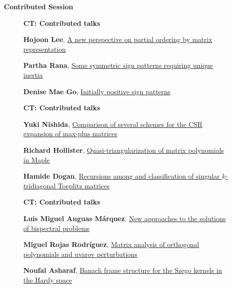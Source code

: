 \documentclass[ILAS2025-program.tex]{subfiles}
\begin{document}
    \begin{description}
    \item[] \textbf{Contributed Session} 
    \begin{description}
    \item[] {\color{mstitle}\textbf{CT: Contributed talks}} 
    \item[] \hypertarget{up0395}{}\textbf{Hojoon Lee}, \hyperlink{down0395}{A new perspective on partial ordering by matrix representation}
        \item[] \hypertarget{up0396}{}\textbf{Partha Rana}, \hyperlink{down0396}{Some symmetric sign patterns requiring unique inertia}
        \item[] \hypertarget{up0397}{}\textbf{Denise Mae Go}, \hyperlink{down0397}{Initially positive sign patterns}
        \end{description}
    \begin{description}
    \item[] {\color{mstitle}\textbf{CT: Contributed talks}} 
    \item[] \hypertarget{up0398}{}\textbf{Yuki Nishida}, \hyperlink{down0398}{Comparison of several schemes for the CSR expansion of max-plus matrices}
        \item[] \hypertarget{up0399}{}\textbf{Richard Hollister}, \hyperlink{down0399}{Quasi-triangularization of matrix polynomials in Maple}
        \item[] \hypertarget{up0400}{}\textbf{Hamide Dogan}, \hyperlink{down0400}{Recursions among and classification of singular $k$-tridiagonal Toeplitz matrices}
        \end{description}
    \begin{description}
    \item[] {\color{mstitle}\textbf{CT: Contributed talks}} 
    \item[] \hypertarget{up0401}{}\textbf{Luis Miguel Anguas Márquez}, \hyperlink{down0401}{New approaches to the solutions of bispectral problems}
        \item[] \hypertarget{up0402}{}\textbf{Miguel Rojas Rodríguez}, \hyperlink{down0402}{Matrix analysis of orthogonal polynomials and uvarov perturbations}
        \item[] \hypertarget{up0403}{}\textbf{Noufal Asharaf}, \hyperlink{down0403}{Banach frame structure for the Szego kernels in the Hardy space}

\end{description}
\end{description}
\end{document}
